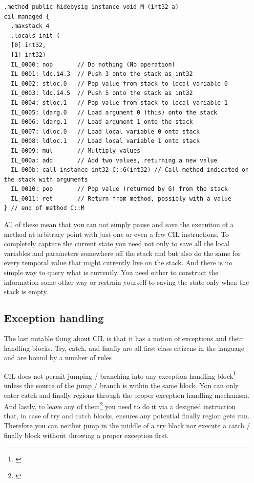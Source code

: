 \begin{verbatim}
.method public hidebysig instance void M (int32 a) 
cil managed {
  .maxstack 4
  .locals init (
  [0] int32,
  [1] int32)
  IL_0000: nop       // Do nothing (No operation)
  IL_0001: ldc.i4.3  // Push 3 onto the stack as int32
  IL_0002: stloc.0   // Pop value from stack to local variable 0
  IL_0003: ldc.i4.5  // Push 5 onto the stack as int32
  IL_0004: stloc.1   // Pop value from stack to local variable 1
  IL_0005: ldarg.0   // Load argument 0 (this) onto the stack
  IL_0006: ldarg.1   // Load argument 1 onto the stack
  IL_0007: ldloc.0   // Load local variable 0 onto stack
  IL_0008: ldloc.1   // Load local variable 1 onto stack
  IL_0009: mul       // Multiply values
  IL_000a: add       // Add two values, returning a new value
  IL_000b: call instance int32 C::G(int32) // Call method indicated on the stack with arguments
  IL_0010: pop       // Pop value (returned by G) from the stack
  IL_0011: ret       // Return from method, possibly with a value
} // end of method C::M
\end{verbatim}

All of these mean that you can not simply pause and save the execution of a method at arbitrary point with just one or even a few CIL instructions. To completely capture the current state you need not only to save all the local variables and parameters somewhere off the stack and but also do the same for every temporal value that might currently live on the stack. And there is no simple way to query what is currently. You need either to construct the information some other way or restrain yourself to saving the state only when the stack is empty.

\subsection{Exception handling}

The last notable thing about CIL is that it has a notion of exceptions and their handling blocks. Try, catch, and finally are all first class citizens in the language and are bound by a number of rules \citep[Sec. I.12.4]{CLIEcma}.

CIL does not permit jumping / branching into any exception handling block\footnote{\citep[Sec. I.12.4.2.8.2.7]{CLIEcma}} unless the source of the jump / branch is within the same block. You can only enter catch and finally regions through the proper exception handling mechanism. And lastly, to leave any of them\footnote{\citep[Sec. I.12.4.2.8.2.8]{CLIEcma}} you need to do it via a designed instruction that, in case of try and catch blocks, ensures any potential finally region gets run. Therefore you can neither jump in the middle of a try block nor execute a catch / finally block without throwing a proper exception first.

